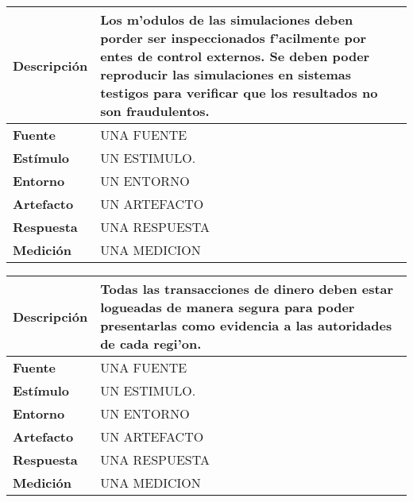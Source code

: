 \begin{center}
  \begin{tabular}{| l | p{10cm} | }
    \hline
  \textbf{Descripción} & Los m'odulos de las simulaciones deben porder ser inspeccionados f'acilmente por entes de control externos. Se deben poder reproducir las simulaciones en sistemas testigos para verificar que los resultados no son fraudulentos.\\  \hline
  \textbf{Fuente} & UNA FUENTE\\  \hline
  \textbf{Estímulo} & UN ESTIMULO.\\  \hline
  \textbf{Entorno} & UN ENTORNO\\  \hline
  \textbf{Artefacto} & UN ARTEFACTO\\  \hline
  \textbf{Respuesta} & UNA RESPUESTA\\  \hline
  \textbf{Medición} & UNA MEDICION\\  \hline
  \end{tabular}
\end{center} 

\begin{center}
  \begin{tabular}{| l | p{10cm} | }
    \hline
  \textbf{Descripción} & Todas las transacciones de dinero deben estar logueadas de manera segura para poder presentarlas como evidencia a las autoridades de cada regi'on.\\  \hline
  \textbf{Fuente} & UNA FUENTE\\  \hline
  \textbf{Estímulo} & UN ESTIMULO.\\  \hline
  \textbf{Entorno} & UN ENTORNO\\  \hline
  \textbf{Artefacto} & UN ARTEFACTO\\  \hline
  \textbf{Respuesta} & UNA RESPUESTA\\  \hline
  \textbf{Medición} & UNA MEDICION\\  \hline
  \end{tabular}
\end{center} 
